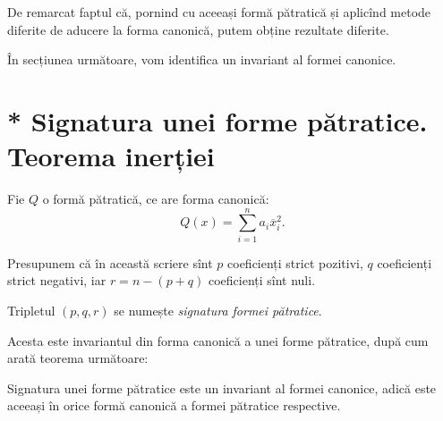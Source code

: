 \begin{remark}
	De remarcat faptul că, pornind cu aceeași formă pătratică și aplicînd metode
diferite de aducere la forma canonică, putem obține rezultate diferite.

În secțiunea următoare, vom identifica un invariant al formei canonice.
\end{remark}


\section{* Signatura unei forme pătratice. Teorema inerției}

\begin{definition}
	Fie $Q$ o formă pătratică, ce are forma canonică: 
 \[
	Q(x) = \sum_{i = 1}^n a_i \overline{x}_i^2.
\]

Presupunem că în această scriere sînt $p$ coeficienți strict pozitivi, $q$
coeficienți strict negativi, iar $r = n - (p + q)$ coeficienți sînt nuli.

Tripletul $(p, q, r)$ se numește \emph{signatura formei pătratice}.
\end{definition}

Acesta este invariantul din forma canonică a unei forme pătratice, după cum
arată teorema următoare:

\begin{theorem}
	Signatura unei forme pătratice este un invariant al formei canonice, adică
este aceeași în orice formă canonică a formei pătratice respective.
\end{theorem}

